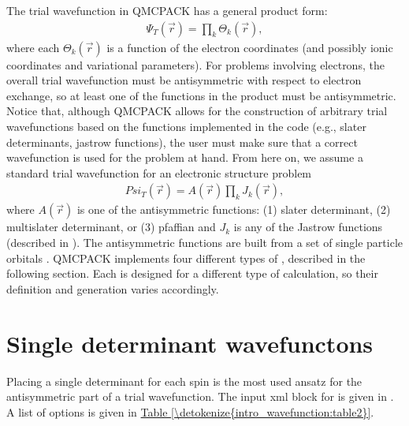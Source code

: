 \documentclass[letterpaper,10pt,english]{sphinxmanual}
\begin{document}
The trial wavefunction in QMCPACK has a general product form:
\begin{equation}\label{equation:intro_wavefunction:eq1}
\begin{split}\Psi_T(\vec{r}) = \prod_k \Theta_k(\vec{r}) ,\end{split}
\end{equation}
where each \(\Theta_k(\vec{r})\) is a function of the electron coordinates
(and possibly ionic coordinates and variational parameters).
For problems involving electrons, the overall trial wavefunction
must be antisymmetric with respect to electron exchange,
so at least one of the functions in the product must be
antisymmetric. Notice that, although QMCPACK allows for the
construction of arbitrary trial wavefunctions based on the
functions implemented in the code
(e.g., slater determinants, jastrow functions),
the user must make sure that a correct wavefunction is
used for the problem at hand. From here on, we assume a
standard trial wavefunction for an electronic structure problem
\begin{equation}\label{equation:intro_wavefunction:eq2}
\begin{split}Psi_T(\vec{r}) =  \textit{A}(\vec{r}) \prod_k \textit{J}_k(\vec{r}),\end{split}
\end{equation}
where \(\textit{A}(\vec{r})\)
is one of the antisymmetric functions: (1) slater determinant, (2) multislater determinant, or (3) pfaffian and \(\textit{J}_k\)
is any of the Jastrow functions (described in {\hyperref[\detokenize{intro_wavefunction:jastrow}]{}}).  The antisymmetric functions are built from a set of single particle orbitals . QMCPACK implements four different types of , described in the following section. Each  is designed for a different type of calculation, so their definition and generation varies accordingly.


\section{Single determinant wavefunctons}
\label{\detokenize{intro_wavefunction:single-determinant-wavefunctons}}\label{\detokenize{intro_wavefunction:singledeterminant}}
Placing a single determinant for each spin is the most used ansatz for the antisymmetric part of a trial wavefunction.
The input xml block for  is given in {\hyperref[\detokenize{intro_wavefunction:listing-1}]{}}. A list of options is given in
\hyperref[\detokenize{intro_wavefunction:table2}]{Table \ref{\detokenize{intro_wavefunction:table2}}}.
\end{document}

